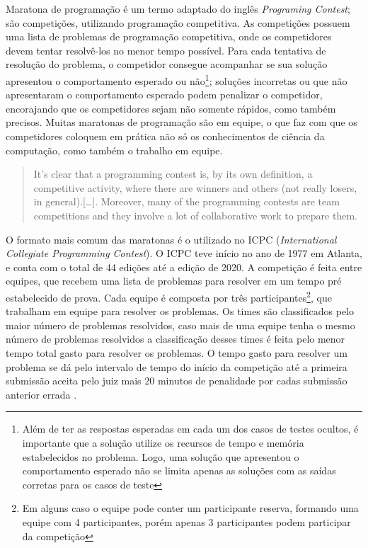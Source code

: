 Maratona de programação é um termo adaptado do inglês \textit{Programing Contest}; são competições, utilizando programação competitiva. As competições possuem uma lista de problemas de programação competitiva, onde os competidores devem tentar resolvê-los no menor tempo possível. Para cada tentativa de resolução do problema, o competidor consegue acompanhar se sua solução apresentou o comportamento esperado ou não\footnote{Além de ter as respostas esperadas em cada um dos casos de testes ocultos, é importante que a solução utilize os recursos de tempo e memória estabelecidos no problema. Logo, uma solução que apresentou o comportamento esperado não se limita apenas as soluções com as saídas corretas para os casos de teste}; soluções incorretas ou que não apresentaram o comportamento esperado podem penalizar o competidor, encorajando que os competidores sejam não somente rápidos, como também precisos. Muitas maratonas de programação são em equipe, o que faz com que os competidores coloquem em prática não só os conhecimentos de ciência da computação, como também o trabalho em equipe.

\begin{quote}
It’s clear that a programming contest is, by its own definition, a competitive activity,
where there are winners and others (not really losers, in general).[\dots]. Moreover, many of the programming contests are team competitions and they involve a lot of collaborative work to prepare them.
\cite[p.132]{revilla2008competitive}
\end{quote}

O formato mais comum das maratonas é o utilizado no ICPC (\textit{International Collegiate Programming Contest}). O ICPC teve início no ano de 1977 em Atlanta, e conta com o total de 44 edições até a edição de 2020. A competição é feita entre equipes, que recebem uma lista de problemas para resolver em um tempo pré estabelecido de prova. Cada equipe é composta por três participantes\footnote{Em alguns caso o equipe pode conter um participante reserva, formando uma equipe com 4 participantes, porém apenas 3 participantes podem participar da competição}, que trabalham em equipe para resolver os problemas. Os times são classificados pelo maior número de problemas resolvidos, caso mais de uma equipe tenha o mesmo número de problemas resolvidos a classificação desses times é feita pelo menor tempo total gasto para resolver os problemas. O tempo gasto para resolver um problema se dá pelo intervalo de tempo do início da competição até a primeira submissão aceita pelo juiz mais 20 minutos de penalidade por cadas submissão anterior errada \cite{aboutICPC}. 

